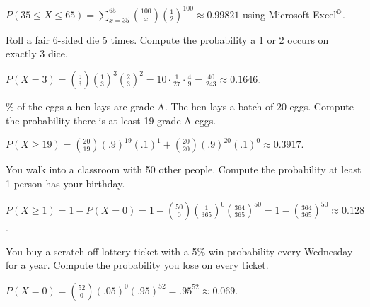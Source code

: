 \documentclass[12pt]{article}
\begin{document}
$P(35\le X\le 65) = \sum_{x=35}^{65}{100\choose x}\left(\frac 12\right)^{100} \approx 0.99821$ using Microsoft Excel$^{\copyright}$.\medskip


\noindent Roll a fair 6-sided die 5 times. Compute the probability a 1 or 2 occurs on exactly 3 dice.

$P(X=3) = {5\choose 3}\left(\frac 13\right)^3\left(\frac 23\right)^2 = 10\cdot \frac 1{27}\cdot \frac 4{9} = \frac {40}{243}\approx 0.1646$.\medskip

\% of the eggs a hen lays are grade-A.  The hen lays a batch of 20 eggs. Compute the probability there is at least 19 grade-A eggs.

$P(X\ge 19) = {20\choose 19}(.9)^{19}(.1)^1 + {20\choose 20}(.9)^{20}(.1)^0 \approx 0.3917$.\medskip


\noindent You walk into a classroom with 50 other people. Compute the probability at least 1 person has your birthday.

$P(X\ge 1) =1-P(X=0) = 1 - {50\choose 0}\left(\frac 1{365}\right)^0\left(\frac {364}{365}\right)^{50} = 1 - \left(\frac {364}{365}\right)^{50}\approx  0.128$.\medskip


\noindent You buy a scratch-off lottery ticket with a 5\% win probability every Wednesday for a year. Compute the probability you lose on every ticket.

$P(X=0) = {52\choose 0}(.05)^0(.95)^{52} = .95^{52} \approx 0.069$.










\newpage





\end{document}
